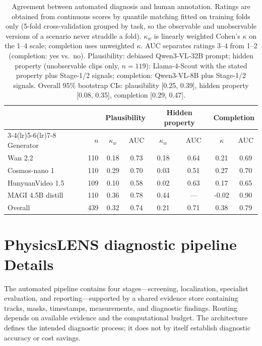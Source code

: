 \begin{table}[h]
    \centering
    \small
    \setlength{\tabcolsep}{4pt}
    \begin{tabular}{@{}lrcccccc@{}}
        \toprule
        & & \multicolumn{2}{c}{Plausibility} & \multicolumn{2}{c}{Hidden property} & \multicolumn{2}{c}{Completion} \\
        \cmidrule(lr){3-4}\cmidrule(lr){5-6}\cmidrule(lr){7-8}
        Generator & $n$ & $\kappa_w$ & AUC & $\kappa_w$ & AUC & $\kappa$ & AUC \\
        \midrule
        Wan 2.2 & 110 & 0.18 & 0.73 & 0.18 & 0.64 & 0.21 & 0.69 \\
        Cosmos-nano 1 & 110 & 0.29 & 0.70 & 0.03 & 0.51 & 0.27 & 0.70 \\
        HunyuanVideo 1.5 & 109 & 0.10 & 0.58 & 0.02 & 0.63 & 0.17 & 0.65 \\
        MAGI 4.5B distill & 110 & 0.36 & 0.78 & 0.44 & --- & -0.02 & 0.90 \\
        \midrule
        Overall & 439 & 0.32 & 0.74 & 0.21 & 0.71 & 0.38 & 0.79 \\
        \bottomrule
    \end{tabular}
    \caption{Agreement between automated diagnosis and human annotation. Ratings are obtained from continuous scores by quantile matching fitted on training folds only (5-fold cross-validation grouped by task, so the observable and unobservable versions of a scenario never straddle a fold). $\kappa_w$ is linearly weighted Cohen's $\kappa$ on the 1--4 scale; completion uses unweighted $\kappa$. AUC separates ratings 3--4 from 1--2 (completion: yes vs.\ no). Plausibility: debiased Qwen3-VL-32B prompt; hidden property (unobservable clips only, $n{=}119$): Llama-4-Scout with the stated property plus Stage-1/2 signals; completion: Qwen3-VL-8B plus Stage-1/2 signals. Overall 95\% bootstrap CIs: plausibility [0.25, 0.39], hidden property [0.08, 0.35], completion [0.29, 0.47].}
    \label{tab:pipeline-human-agreement}
\end{table}

\section{PhysicsLENS diagnostic pipeline Details}
\label{app:pipeline-details}

The automated pipeline contains four stages---screening, localization, specialist evaluation, and reporting---supported by a shared evidence store containing tracks, masks, timestamps, measurements, and diagnostic findings. Routing depends on available evidence and the computational budget. The architecture defines the intended diagnostic process; it does not by itself establish diagnostic accuracy or cost savings.

